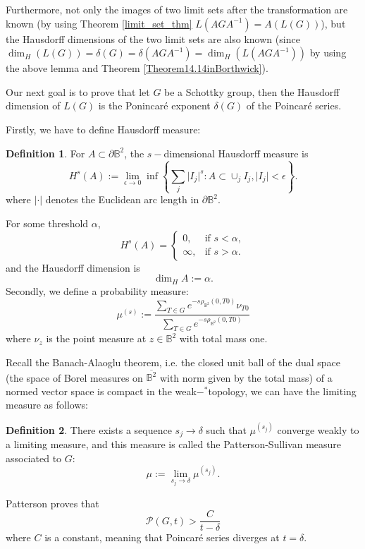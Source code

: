 \documentclass[12pt,oneside]{sfsuthesis}
\theoremstyle{plain} %
\theoremstyle{definition}  %
\newtheorem{definition}{Definition}[chapter]
\theoremstyle{remark}  %
\theoremstyle{plain}
\begin{document}
{Furthermore, not only the images of two limit sets after the transformation are known (by using Theorem \ref{limit_set_thm} $L(AGA^{-1})=A(L(G))$), but the Hausdorff dimensions of the two limit sets are also known (since $\dim_H\left( L(G) \right)=\delta(G)=\delta(AGA^{-1})=\dim_H \left(L(AGA^{-1})\right)$ by using the above lemma and Theorem \ref{Theorem14.14inBorthwick}). 

Our next goal is to prove that let $G$ be a Schottky group, then the Hausdorff dimension of $L(G)$ is the Ponincar\'{e} exponent $\delta(G)$ of the Poincar\'{e} series.

Firstly, we have to define Hausdorff measure:

\begin{definition}
For $A\subset \partial\mathbb{B}^2$, the $s-$dimensional Hausdorff measure is 
$$
H^s\left(A\right):=\lim\limits_{\epsilon\to 0}\inf\left\lbrace \sum\limits_{j}\vert I_j\vert^s:A\subset \cup_j I_j,\vert I_j\vert<\epsilon \right\rbrace.
$$
where $\vert \cdot\vert $ denotes the Euclidean arc length in $\partial\mathbb{B}^2$.
\end{definition}
For some threshold $\alpha$,
$$
H^s\left(A\right)=\begin{cases} 
      0, & \text{if } s<\alpha, \\
      \infty, &\text{if } s>\alpha. 
   \end{cases}
$$
and the Hausdorff dimension is 
$$
\dim_{H}A:=\alpha.
$$
Secondly, we define a probability measure:
$$
\mu^{(s)}:=\frac{\sum\limits_{T\in G}e^{-s\rho_{\mathbb{B}^2}(0,T0)}\nu_{T0}}{\sum\limits_{T\in G}e^{-s\rho_{\mathbb{B}^2}(0,T0)}}
$$
where $\nu_z$ is the point measure at $z\in\mathbb{B}^2$ with total mass one.

Recall the Banach-Alaoglu theorem, i.e. the closed unit ball of the dual space (the space of Borel measures on $\overline{\mathbb{B}^2}$ with norm given by the total mass) of a normed vector space is compact in the weak$-^{\ast}$topology, we can have the limiting measure as follows:
\begin{definition}
There exists a sequence $s_j\to \delta$ such that $\mu^{(s_j)}$ converge weakly to a limiting measure, and this measure is called the Patterson-Sullivan measure associated to $G$:
$$
\mu:=\lim\limits_{s_j\to\delta}\mu^{(s_j)}.
$$
\end{definition}
Patterson\cite{patterson1976limit} proves that 
$$
\mathcal{P}(G,t)>\frac{C}{t-\delta}
$$
where $C$ is a constant, meaning that Poincar\'{e} series diverges at $t=\delta$.


}
\end{document}
